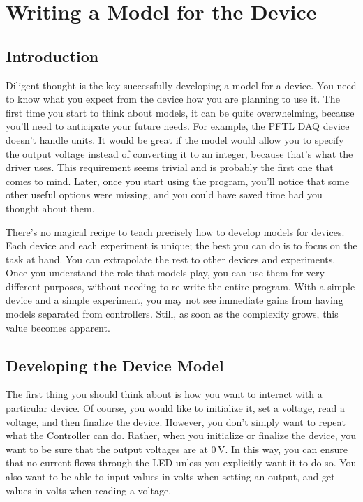 \chapter{Writing a Model for the Device}\label{ch:device-model}

\section{Introduction}\label{sec:device-model-introduction}
Diligent thought is the key successfully developing a model for a device. You need to know what you expect from the device how you are planning to use it. The first time you start to think about models, it can be quite overwhelming, because you'll need to anticipate your future needs. For example, the {PFTL DAQ} device doesn't handle units. It would be great if the model would allow you to specify the output voltage instead of converting it to an integer, because that's what the driver uses. This requirement seems trivial and is probably the first one that comes to mind. Later, once you start using the program, you'll notice that some other useful options were missing, and you could have saved time had you thought about them.

There's no magical recipe to teach precisely how to develop models for devices. Each device and each experiment is unique; the best you can do is to focus on the task at hand. You can extrapolate the rest to other devices and experiments. Once you understand the role that models play, you can use them for very different purposes, without needing to re-write the entire program. With a simple device and a simple experiment, you may not see immediate gains from having models separated from controllers. Still, as soon as the complexity grows, this value becomes apparent.


\section{Developing the Device Model}\label{sec:device-model}
The first thing you should think about is how you want to interact with a particular device. Of course, you would like to initialize it, set a voltage, read a voltage, and then finalize the device. However, you don't simply want to repeat what the Controller can do. Rather, when you initialize or finalize the device, you want to be sure that the output voltages are at $0\,\textrm{V}$. In this way, you can ensure that no current flows through the LED unless you explicitly want it to do so. You also want to be able to input values in volts when setting an output, and get values in volts when reading a voltage.

